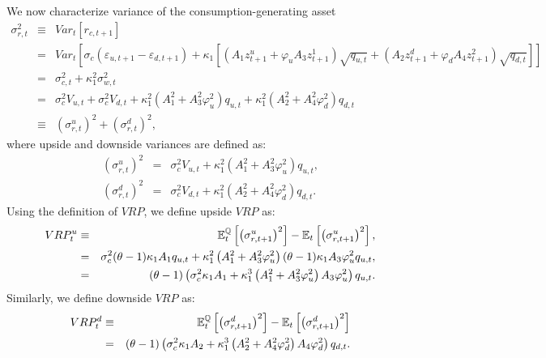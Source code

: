 \documentclass[11pt]{article}
\begin{document}
\begin{small}
We now characterize variance of the consumption-generating
asset
\begin{eqnarray*}
\sigma _{r,t}^{2} &\equiv &Var_{t}\left[ r_{c,t+1}\right] \\
&=&Var_t\left[\sigma_c(\varepsilon_{u,t+1}-\varepsilon_{d,t+1})+\kappa_1%
\left[(A_1z^u_{t+1}+\varphi_uA_3z^1_{t+1})\sqrt{q_{u,t}}+(A_2z^d_{t+1}+%
\varphi_dA_4z^2_{t+1})\sqrt{q_{d,t}}\right]\right] \\
&=&\sigma _{c,t}^{2}+\kappa _{1}^{2}\sigma _{w,t}^{2} \\
&=&\sigma _{c}^{2}V_{u,t}+\sigma _{c}^{2}V_{d,t}+\kappa _{1}^{2}\left(
A_{1}^{2}+A_{3}^{2}\varphi _{u}^{2}\right) q_{u,t}+\kappa _{1}^{2}\left(
A_{2}^{2}+A_{4}^{2}\varphi _{d}^{2}\right) q_{d,t} \\
&\equiv &\left( \sigma _{r,t}^{u}\right) ^{2}+\left( \sigma
_{r,t}^{d}\right) ^{2},
\end{eqnarray*}%
where upside and downside variances are defined as:%
\begin{eqnarray}
\left( \sigma _{r,t}^{u}\right) ^{2} &=&\sigma _{c}^{2}V_{u,t}+\kappa
_{1}^{2}\left( A_{1}^{2}+A_{3}^{2}\varphi _{u}^{2}\right) q_{u,t},
\label{EqUpsideVariance} \\
\left( \sigma _{r,t}^{d}\right) ^{2} &=&\sigma _{c}^{2}V_{d,t}+\kappa
_{1}^{2}\left( A_{2}^{2}+A_{4}^{2}\varphi _{d}^{2}\right) q_{d,t}.
\label{EqDownsideVariance}
\end{eqnarray}%
Using the definition of $VRP$, we define upside $VRP$ as:
\begin{eqnarray}
VRP_{t}^{u} &\equiv &\mathbb{E}_{t}^{\mathbb{Q}}\left[ \left( \sigma
_{r,t+1}^{u}\right) ^{2}\right] -\mathbb{E}_{t}\left[ \left( \sigma
_{r,t+1}^{u}\right) ^{2}\right] ,  \notag \\
&=&\sigma _{c}^{2}(\theta -1)\kappa _{1}A_{1}q_{u,t}+\kappa _{1}^{2}\left(
A_{1}^{2}+A_{3}^{2}\varphi _{u}^{2}\right) (\theta -1)\kappa
_{1}A_{3}\varphi _{u}^{2}q_{u,t},  \notag \\
&=&(\theta -1)\left( \sigma _{c}^{2}\kappa _{1}A_{1}+\kappa _{1}^{3}\left(
A_{1}^{2}+A_{3}^{2}\varphi _{u}^{2}\right) A_{3}\varphi _{u}^{2}\right)
q_{u,t}.  \label{EqUVRPFinal}
\end{eqnarray}%
Similarly, we define downside $VRP$ as:%
\begin{eqnarray}
VRP_{t}^{d} &\equiv &\mathbb{E}_{t}^{\mathbb{Q}}\left[ \left( \sigma
_{r,t+1}^{d}\right) ^{2}\right] -\mathbb{E}_{t}\left[ \left( \sigma
_{r,t+1}^{d}\right) ^{2}\right]  \notag \\
&=&(\theta -1)\left( \sigma _{c}^{2}\kappa _{1}A_{2}+\kappa _{1}^{3}\left(
A_{2}^{2}+A_{4}^{2}\varphi _{d}^{2}\right) A_{4}\varphi _{d}^{2}\right)
q_{d,t}.  \label{EqDVRPFinal}
\end{eqnarray}


\end{small}
\end{document}
